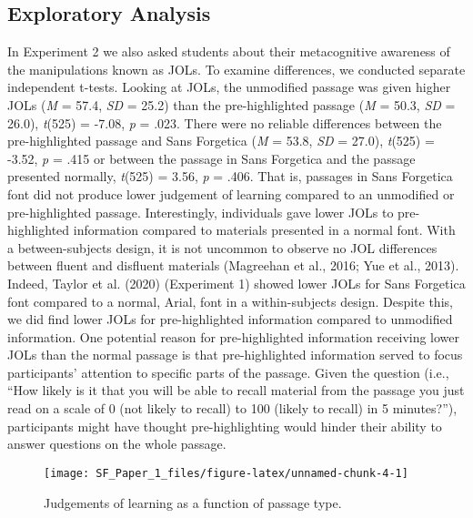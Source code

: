 \documentclass[jou]{apa6}
\begin{document}
\hypertarget{exploratory-analysis}{%
\subsection{Exploratory Analysis}\label{exploratory-analysis}}

In Experiment 2 we also asked students about their metacognitive awareness of the manipulations known as JOLs. To examine differences, we conducted separate independent t-tests. Looking at JOLs, the unmodified passage was given higher JOLs (\emph{M} = 57.4, \emph{SD} = 25.2) than the pre-highlighted passage (\emph{M} = 50.3, \emph{SD} = 26.0), \emph{t}(525) = -7.08, \emph{p} = .023. There were no reliable differences between the pre-highlighted passage and Sans Forgetica (\emph{M} = 53.8, \emph{SD} = 27.0), \emph{t}(525) = -3.52, \emph{p} = .415 or between the passage in Sans Forgetica and the passage presented normally, \emph{t}(525) = 3.56, \emph{p} = .406. That is, passages in Sans Forgetica font did not produce lower judgement of learning compared to an unmodified or pre-highlighted passage. Interestingly, individuals gave lower JOLs to pre-highlighted information compared to materials presented in a normal font. With a between-subjects design, it is not uncommon to observe no JOL differences between fluent and disfluent materials (Magreehan et al., 2016; Yue et al., 2013). Indeed, Taylor et al. (2020) (Experiment 1) showed lower JOLs for Sans Forgetica font compared to a normal, Arial, font in a within-subjects design. Despite this, we did find lower JOLs for pre-highlighted information compared to unmodified information. One potential reason for pre-highlighted information receiving lower JOLs than the normal passage is that pre-highlighted information served to focus participants' attention to specific parts of the passage. Given the question (i.e., \enquote{How likely is it that you will be able to recall material from the passage you just read on a scale of 0 (not likely to recall) to 100 (likely to recall) in 5 minutes?}), participants might have thought pre-highlighting would hinder their ability to answer questions on the whole passage.

\begin{figure}

{\centering \texttt{[image: SF\_Paper\_1\_files/figure-latex/unnamed-chunk-4-1]} 

}

\caption{Judgements of learning as a function of passage type.}\label{fig:unnamed-chunk-4}
\end{figure}
\end{document}
